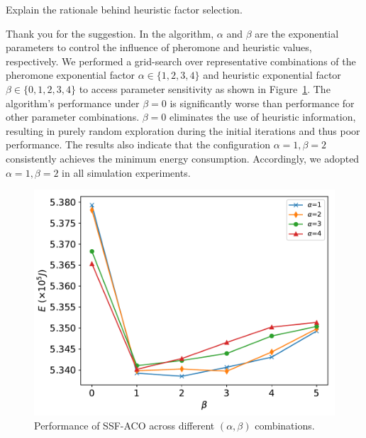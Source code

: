 \begin{metaresponse}
\end{metaresponse}

\begin{metacomment}
	Explain the rationale behind heuristic factor selection.
\end{metacomment}
\begin{metaresponse}
	Thank you for the suggestion.
	In the algorithm, $\alpha$ and $\beta$ are the exponential parameters to control the influence of pheromone and heuristic values, respectively.
	We performed a grid-search over representative combinations of the pheromone exponential factor $\alpha\in\{1,2,3,4\}$ and heuristic exponential factor $\beta\in\{0,1,2,3,4\}$ to access parameter sensitivity as shown in Figure~\ref{meta:fig:cali}.
	The algorithm's performance under $\beta=0$ is significantly worse than performance for other parameter combinations. $\beta=0$ eliminates the use of heuristic information, resulting in purely random exploration during the initial iterations and thus poor performance.
	The results also indicate that the configuration $\alpha=1,\beta=2$ consistently achieves the minimum energy consumption. Accordingly, we adopted $\alpha=1,\beta=2$ in all simulation experiments.
	\begin{figure}[h]
		\centerline{\includegraphics[width=.5\textwidth]{fig/cali.pdf}}
		\caption{Performance of SSF-ACO across different $(\alpha,\beta)$ combinations.}
		\label{meta:fig:cali}
	\end{figure}
\end{metaresponse}

